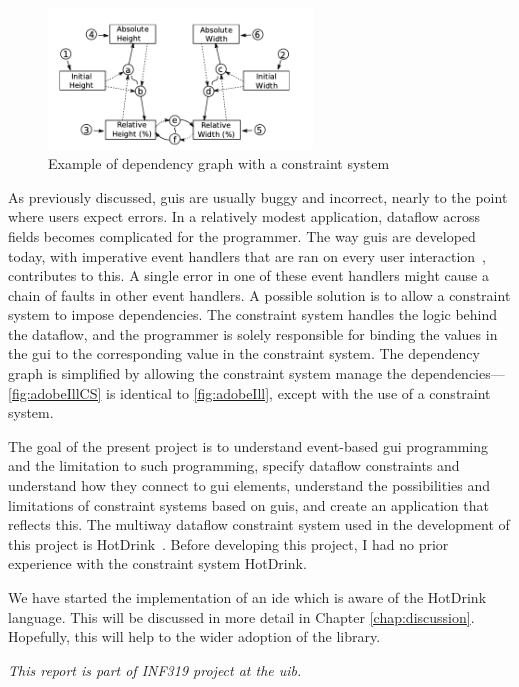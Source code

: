 
\begin{figure}
    \centering
    \includegraphics[width=7cm, frame]{figures/adobeIllCS.png}
    \caption{Example of dependency graph with a constraint system}
    \label{fig:adobeIllCS}
\end{figure}

As previously discussed, \gls{gui}s are usually buggy and incorrect, nearly to the point where users expect errors. In a relatively modest application, dataflow across fields becomes complicated for the programmer. The way \gls{gui}s are developed today, with imperative event handlers that are ran on every user interaction~\cite{all2021multi}, contributes to this. A single error in one of these event handlers might cause a chain of faults in other event handlers. A possible solution is to allow a constraint system to impose dependencies. The constraint system handles the logic behind the dataflow, and the programmer is solely responsible for binding the values in the \gls{gui} to the corresponding value in the constraint system. The dependency graph is simplified by allowing the constraint system manage the dependencies---\autoref{fig:adobeIllCS} is identical to \autoref{fig:adobeIll}, except with the use of a constraint system.

The goal of the present project is to understand event-based \gls{gui} programming and the limitation to such programming, specify dataflow constraints and understand how they connect to \gls{gui} elements, understand the possibilities and limitations of constraint systems based on \gls{gui}s, and create an application that reflects this. The multiway dataflow constraint system used in the development of this project is HotDrink~\cite{HotDrink1}. Before developing this project, I had no prior experience with the constraint system HotDrink.

We have started the implementation of an \gls{ide} which is aware of the HotDrink language. This will be discussed in more detail in Chapter \ref{chap:discussion}. Hopefully, this will help to the wider adoption of the library.

\textit{This report is part of INF319 project at the \gls{uib}.}
